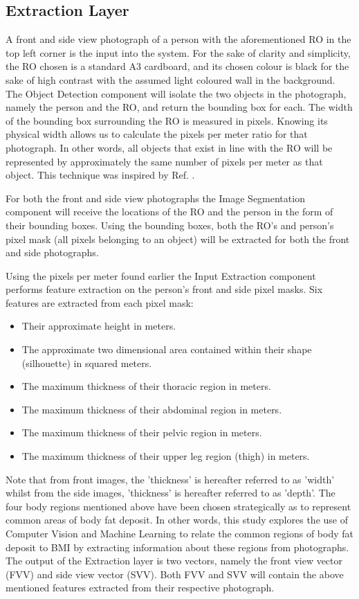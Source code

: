 \documentclass[conference]{IEEEtran}
\begin{document}
\subsection{Extraction Layer}
A front and side view photograph of a person with the aforementioned RO in the top left corner is the input into the system.
For the sake of clarity and simplicity, the RO chosen is a standard A3 cardboard, and its chosen colour is black for the sake of high contrast with the assumed light coloured wall in the background.
The Object Detection component will isolate the two objects in the photograph, namely the person and the RO, and return the bounding box for each.
The width of the bounding box surrounding the RO is measured in pixels.
Knowing its physical width allows us to calculate the pixels per meter ratio for that photograph.
In other words, all objects that exist in line with the RO will be represented by approximately the same number of pixels per meter as that object.
This technique was inspired by Ref. \cite{objectDetection}.

For both the front and side view photographs the Image Segmentation component will receive the locations of the RO and the person in the form of their bounding boxes.
Using the bounding boxes, both the RO's and person's pixel mask (all pixels belonging to an object) will be extracted for both the front and side photographs.

Using the pixels per meter found earlier the Input Extraction component performs feature extraction on the person's front and side pixel masks.
Six features are extracted from each pixel mask:
\begin{itemize}
	\item Their approximate height in meters.
	\item The approximate two dimensional area contained within their shape (silhouette) in squared meters.
	\item The maximum thickness of their thoracic region in meters.
	\item The maximum thickness of their abdominal region in meters.
	\item The maximum thickness of their pelvic region in meters.
	\item The maximum thickness of their upper leg region (thigh) in meters.	
\end{itemize}
Note that from front images, the 'thickness' is hereafter referred to as 'width' whilst from the side images, 'thickness' is hereafter referred to as 'depth'.
The four body regions mentioned above have been chosen strategically as to represent common areas of body fat deposit. %
In other words, this study explores the use of Computer Vision and Machine Learning to relate the common regions of body fat deposit to BMI by extracting information about these regions from photographs.
The output of the Extraction layer is two vectors, namely the front view vector (FVV) and side view vector (SVV).
Both FVV and SVV will contain the above mentioned features extracted from their respective photograph.
\end{document}
